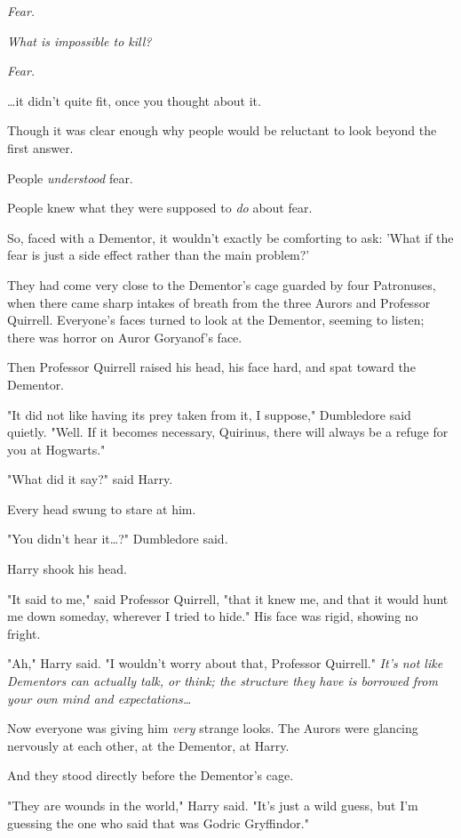 \emph{Fear.}

\emph{What is impossible to kill?}

\emph{Fear.}

{\ldots}it didn't quite fit, once you thought about it.

Though it was clear enough why people would be reluctant to look beyond the 
first answer.

People \emph{understood} fear.

People knew what they were supposed to \emph{do} about fear.

So, faced with a Dementor, it wouldn't exactly be comforting to ask: 'What if 
the fear is just a side effect rather than the main problem?'

They had come very close to the Dementor's cage guarded by four Patronuses, 
when there came sharp intakes of breath from the three Aurors and Professor 
Quirrell. Everyone's faces turned to look at the Dementor, seeming to listen; 
there was horror on Auror Goryanof's face.

Then Professor Quirrell raised his head, his face hard, and spat toward the 
Dementor.

"It did not like having its prey taken from it, I suppose," Dumbledore said 
quietly. "Well. If it becomes necessary, Quirinus, there will always be a 
refuge for you at Hogwarts."

"What did it say?" said Harry.

Every head swung to stare at him.

"You didn't hear it{\ldots}?" Dumbledore said.

Harry shook his head.

"It said to me," said Professor Quirrell, "that it knew me, and that it would 
hunt me down someday, wherever I tried to hide." His face was rigid, showing no 
fright.

"Ah," Harry said. "I wouldn't worry about that, Professor Quirrell." \emph{It's 
not like Dementors can actually talk, or think; the structure they have is 
borrowed from your own mind and expectations{\ldots}}

Now everyone was giving him \emph{very} strange looks. The Aurors were glancing 
nervously at each other, at the Dementor, at Harry.

And they stood directly before the Dementor's cage.

"They are wounds in the world," Harry said. "It's just a wild guess, but I'm 
guessing the one who said that was Godric Gryffindor."

